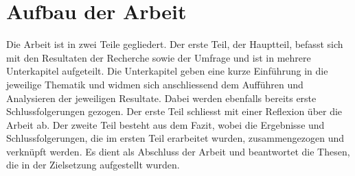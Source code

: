 \section{Aufbau der Arbeit}

Die Arbeit ist in zwei Teile gegliedert. 
Der erste Teil, der Hauptteil, befasst sich mit den Resultaten der Recherche sowie der Umfrage und ist in mehrere Unterkapitel aufgeteilt. Die Unterkapitel geben eine kurze Einführung in die jeweilige Thematik und widmen sich anschliessend dem Aufführen und Analysieren der jeweiligen Resultate. Dabei werden ebenfalls bereits erste Schlussfolgerungen gezogen. Der erste Teil schliesst mit einer Reflexion über die Arbeit ab. 
Der zweite Teil besteht aus dem Fazit, wobei die Ergebnisse und Schlussfolgerungen, die im ersten Teil erarbeitet wurden, zusammengezogen und verknüpft werden. Es dient als Abschluss der Arbeit und beantwortet die Thesen, die in der Zielsetzung aufgestellt wurden.
\newpage